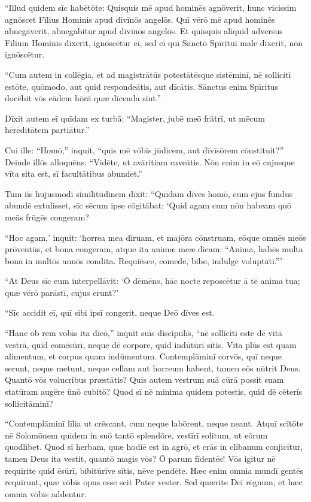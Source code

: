 \Versus ``Illud quidem sīc habētōte: Quisquis mē apud hominēs agnōverit, hunc vicissim agnōscet Fīlius Hominis apud dīvīnōs angelōs.
\Versus Quī vērō mē apud hominēs abnegāverit, abnegābitur apud dīvīnōs angelōs.
\Versus Et quisquis aliquid adversus Fīlium Hominis dīxerit, ignōscētur eī, sed eī quī Sānctō Spīrituī male dīxerit, nōn ignōscētur.

\Versus ``Cum autem in collēgia, et ad magistrātūs potestātēsque sistēminī, nē sollicitī estōte, quōmodo, aut quid respondeātis, aut dīcātis.
\Versus Sānctus enim Spīritus docēbit vōs eādem hōrā quæ dīcenda sint.''

\Versus Dīxit autem eī quīdam ex turbā: ``Magister, jubē meō frātrī, ut mēcum hērēditātem partiātur.''

\Versus Cui ille: ``Homō,'' inquit, ``quis mē vōbīs jūdicem, aut dīvīsōrem cōnstituit?''
\Versus Dein\-de illōs alloquēns: ``Vidēte, ut avāritiam caveātis. Nōn enim in eō cujusque vīta sita est, sī facultātibus abundet.''

\Versus Tum iīs hujusmodī similitūdinem dīxit: ``Quīdam dīves homō, cum ejus fundus abundē extulisset,
\Versus sīc sēcum ipse cōgitābat: `Quid agam cum nōn habeam quō meās frūgēs congeram?

\Versus ``Hoc agam,' inquit: `horrea mea dīruam, et majōra cōnstruam, eōque omnēs meōs prōventūs, et bona congeram,
\Versus atque ita animæ meæ dicam: ``Anima, habēs multa bona in multōs annōs condita. Requiēsce, comede, bibe, indulgē voluptātī.''{}'

\Versus ``At Deus sīc eum interpellāvit: `Ō dēmēns, hāc nocte reposcētur ā tē anima tua; quæ vērō parāstī, cujus erunt?'

\Versus ``Sīc accidit eī, quī sibi ipsī congerit, neque Deō dīves est.

\Versus ``Hanc ob rem vōbīs ita dīcō,'' inquit suīs discipulīs, ``nē sollicitī este dē vītā vestrā, quid comēsūrī, neque dē corpore, quid indūtūrī sītis.
\Versus Vīta plūs est quam alimentum, et corpus quam indūmentum.
\Versus Contemplāminī corvōs, quī neque serunt, neque metunt, neque cellam aut horreum habent, tamen eōs nūtrit Deus. Quantō vōs volucribus præstātis?
\Versus Quis autem vestrum suā cūrā possit suam statūram augēre ūnō cubitō?
\Versus Quod sī nē minima quidem potestis, quid dē cēterīs sollicitāminī?

\Versus ``Contemplāminī līlia ut crēscant, cum neque labōrent, neque neant. Atquī scītōte nē Solomōnem quidem in suō tantō splendōre, vestīrī solitum, ut eōrum quodlibet.
\Versus Quod sī herbam, quæ hodiē est in agrō, et crās in clībanum conjicitur, tamen Deus ita vestit, quantō magis vōs? Ō parum fīdentēs!
\Versus Vōs igitur nē requīrite quid ēsūrī, bibitūrīve sītis, nēve pendēte.
\Versus Hæc enim omnia mundī gentēs requīrunt, quæ vōbīs opus esse scit Pater vester.
\Versus Sed quærite Deī rēgnum, et hæc omnia vōbīs addentur.

